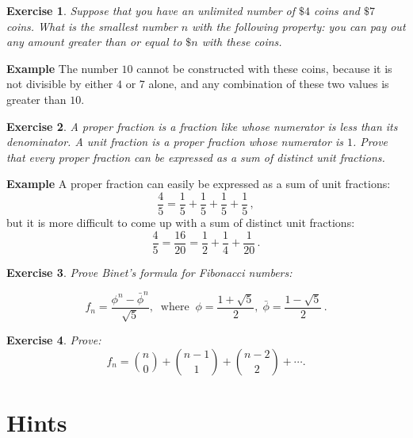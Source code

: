 \documentclass[11pt,a4paper]{report}
\newtheorem{exercise}{Exercise}
\begin{document}
\begin{exercise}\label{e.coins}
Suppose that you have an unlimited number of $\$4$ coins and $\$7$ coins. What is the smallest number $n$ with the following property: you can pay out \emph{any} amount greater than or equal to $\$n$ with these coins.
\end{exercise}

\vspace*{-10pt}

\textbf{Example} The number $10$ cannot be constructed with these coins, because it is not divisible by either $4$ or $7$ alone, and any combination of these two values is greater than $10$.

\medskip

\begin{exercise}\label{e.proper}
A \emph{proper fraction} is a fraction like whose numerator is less than its denominator. A \emph{unit fraction} is a proper fraction whose numerator is $1$. Prove that every proper fraction can be expressed as a sum of distinct unit fractions.
\end{exercise}

\vspace*{-10pt}

\textbf{Example} A proper fraction can easily be expressed as a sum of unit fractions:
\[
\frac{4}{5} = \frac{1}{5} + \frac{1}{5} + \frac{1}{5} + \frac{1}{5}\,,
\]
but it is more difficult to come up with a sum of distinct unit fractions:
\[
\frac{4}{5} = \frac{16}{20} = \frac{1}{2} + \frac{1}{4} + \frac{1}{20}\,.
\]

\medskip

\begin{exercise}\label{e.binet}
Prove \emph{Binet's formula} for Fibonacci numbers:

\begin{displaymath}
f_n = \frac{\phi^n - \bar{\phi}^n}{\sqrt{5}}, \;\; \mathrm{where} \;\;
\phi = \frac{1+\sqrt{5}}{2},\;\bar{\phi} = \frac{1-\sqrt{5}}{2}\,.
\end{displaymath}
\end{exercise}

\medskip

\begin{exercise}\label{e.pascal}
Prove:
\[
f_n = {n \choose 0} + {n-1 \choose 1} + {n-2 \choose 2} + \cdots.
\]
\end{exercise}

\newpage

\section{Hints}
\end{document}
